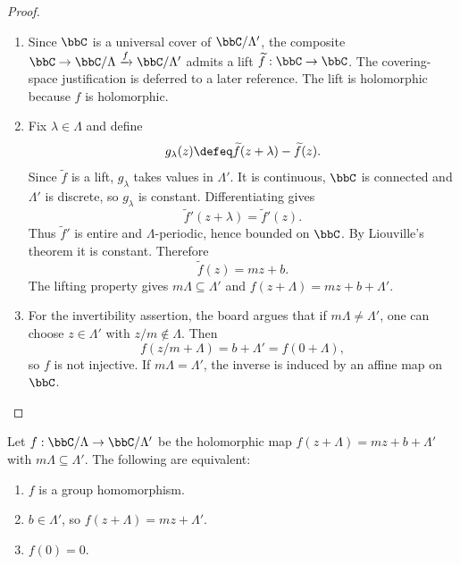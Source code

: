 \begin{proof}
    \leavevmode
    \begin{enumerate}[label=\textit{Step~\arabic*.}]
        \item Since $\bbC$ is a universal cover of $\bbC/\Lambda'$, the composite $\bbC \to \bbC/\Lambda \xrightarrow{f} \bbC/\Lambda'$ admits a lift $\widetilde f : \bbC \to \bbC$. The covering-space justification is deferred to a later reference. The lift is holomorphic because $f$ is holomorphic.

        \item Fix $\lambda \in \Lambda$ and define
        \[
            g_\lambda(z) \defeq \widetilde f(z + \lambda) - \widetilde f(z).
        \]
        Since $\widetilde f$ is a lift, $g_\lambda$ takes values in $\Lambda'$. It is continuous, $\bbC$ is connected and $\Lambda'$ is discrete, so $g_\lambda$ is constant. Differentiating gives
        \[
            \widetilde f'(z + \lambda) = \widetilde f'(z).
        \]
        Thus $\widetilde f'$ is entire and $\Lambda$-periodic, hence bounded on $\bbC$. By Liouville's theorem it is constant. Therefore
        \[
            \widetilde f(z) = mz + b.
        \]
        The lifting property gives $m\Lambda \subseteq \Lambda'$ and $f(z + \Lambda) = mz + b + \Lambda'$.

        \item For the invertibility assertion, the board argues that if $m\Lambda \neq \Lambda'$, one can choose $z \in \Lambda'$ with $z/m \notin \Lambda$. Then
        \[
            f(z/m + \Lambda) = b + \Lambda' = f(0 + \Lambda),
        \]
        so $f$ is not injective. If $m\Lambda = \Lambda'$, the inverse is induced by an affine map on $\bbC$.
    \end{enumerate}
\end{proof}

\begin{proposition}\label{Prop:MF_torus_homomorphism}
    Let $f : \bbC/\Lambda \to \bbC/\Lambda'$ be the holomorphic map $f(z + \Lambda) = mz + b + \Lambda'$ with $m\Lambda \subseteq \Lambda'$. The following are equivalent:
    \begin{enumerate}[label=(\arabic*)]
        \item $f$ is a group homomorphism.
        \item $b \in \Lambda'$, so $f(z + \Lambda) = mz + \Lambda'$.
        \item $f(0) = 0$.
    \end{enumerate}
\end{proposition}

